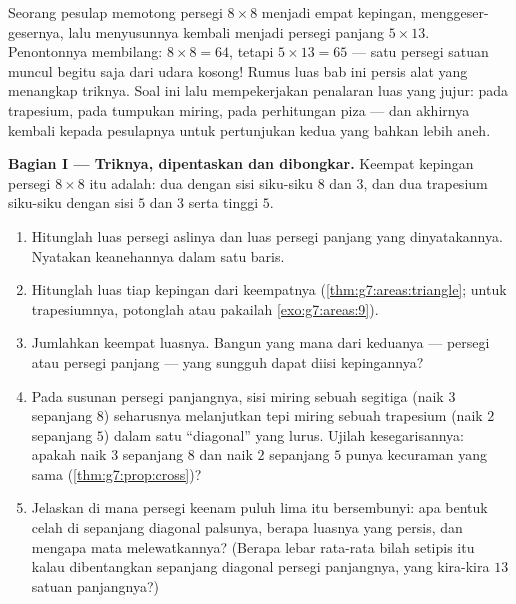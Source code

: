 \begin{problem}[{Soal akhir pekan --- ``bukti'' terkenal bahwa
$64 = 65$, yang dibongkar oleh luas dan kemiringan, dengan piza dan
cincin sebagai pencuci mulut}]
\label{pb:g7:areas:1}
Seorang pesulap memotong persegi $8 \times 8$ menjadi empat
kepingan, menggeser-gesernya, lalu menyusunnya kembali menjadi
persegi panjang $5 \times 13$. Penontonnya membilang:
$8 \times 8 = 64$, tetapi
$5 \times 13 = 65$ --- satu persegi satuan muncul begitu saja
dari udara kosong! Rumus luas bab ini persis alat yang
menangkap triknya. Soal ini lalu mempekerjakan penalaran luas
yang jujur: pada trapesium, pada tumpukan miring, pada
perhitungan piza --- dan akhirnya kembali kepada pesulapnya untuk
pertunjukan kedua yang bahkan lebih aneh.

\medskip
\noindent\textbf{Bagian I --- Triknya, dipentaskan dan dibongkar.}
Keempat kepingan persegi $8 \times 8$ itu adalah: dua  dengan sisi siku-siku $8$ dan $3$, dan dua trapesium
siku-siku dengan sisi  $5$ dan $3$ serta tinggi $5$.
\begin{enumerate}
  \item Hitunglah luas persegi aslinya dan luas persegi panjang
        yang dinyatakannya. Nyatakan keanehannya dalam satu baris.
  \item Hitunglah luas tiap kepingan dari keempatnya
        (\cref{thm:g7:areas:triangle}; untuk trapesiumnya,
        potonglah atau pakailah \cref{exo:g7:areas:9}).
  \item Jumlahkan keempat luasnya. Bangun yang mana dari keduanya
        --- persegi atau persegi panjang --- yang sungguh dapat
        diisi kepingannya?
  \item Pada susunan persegi panjangnya, sisi miring sebuah
        segitiga (naik $3$ sepanjang $8$) seharusnya melanjutkan
        tepi miring sebuah trapesium (naik $2$ sepanjang $5$)
        dalam satu ``diagonal'' yang lurus. Ujilah kesegarisannya:
        apakah naik $3$ sepanjang $8$ dan naik $2$ sepanjang $5$
        punya kecuraman yang sama (\cref{thm:g7:prop:cross})?
  \item Jelaskan di mana persegi keenam puluh lima itu bersembunyi:
        apa bentuk celah di sepanjang diagonal palsunya, berapa
        luasnya yang persis, dan mengapa mata melewatkannya?
        (Berapa lebar rata-rata bilah setipis itu kalau
        dibentangkan sepanjang diagonal persegi panjangnya, yang
        kira-kira $13$ satuan panjangnya?)
\end{enumerate}


\end{problem}
